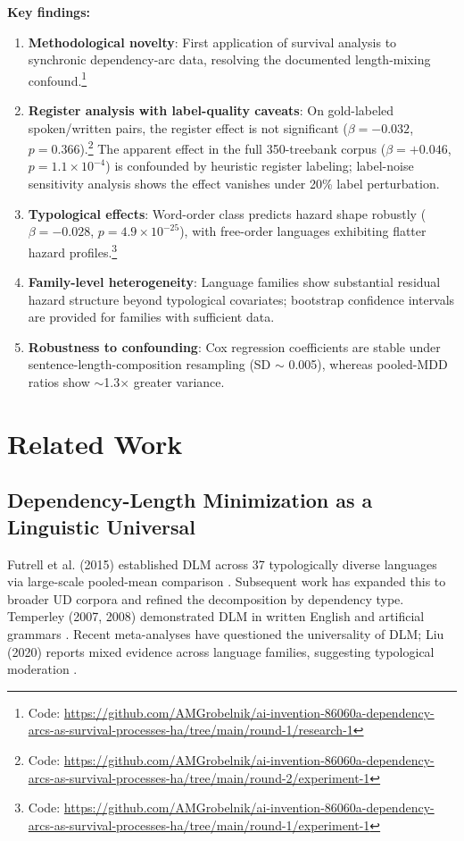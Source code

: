\documentclass[11pt,letterpaper]{article}
\begin{document}
\textbf{Key findings:}
\begin{enumerate}
\item \textbf{Methodological novelty}: First application of survival analysis to synchronic dependency-arc data, resolving the documented length-mixing confound.\footnote{Code: \url{https://github.com/AMGrobelnik/ai-invention-86060a-dependency-arcs-as-survival-processes-ha/tree/main/round-1/research-1}}
\item \textbf{Register analysis with label-quality caveats}: On gold-labeled spoken/written pairs, the register effect is not significant ($\beta=-0.032$, $p=0.366$).\footnote{Code: \url{https://github.com/AMGrobelnik/ai-invention-86060a-dependency-arcs-as-survival-processes-ha/tree/main/round-2/experiment-1}} The apparent effect in the full 350-treebank corpus ($\beta=+0.046$, $p=1.1\times10^{-4}$) is confounded by heuristic register labeling; label-noise sensitivity analysis shows the effect vanishes under 20\% label perturbation.
\item \textbf{Typological effects}: Word-order class predicts hazard shape robustly ($\beta=-0.028$, $p=4.9\times10^{-25}$), with free-order languages exhibiting flatter hazard profiles.\footnote{Code: \url{https://github.com/AMGrobelnik/ai-invention-86060a-dependency-arcs-as-survival-processes-ha/tree/main/round-1/experiment-1}}
\item \textbf{Family-level heterogeneity}: Language families show substantial residual hazard structure beyond typological covariates; bootstrap confidence intervals are provided for families with sufficient data.
\item \textbf{Robustness to confounding}: Cox regression coefficients are stable under sentence-length-composition resampling (SD $\sim$ 0.005), whereas pooled-MDD ratios show $\sim$1.3$\times$ greater variance.
\end{enumerate}

\section{Related Work}

\subsection{Dependency-Length Minimization as a Linguistic Universal}

Futrell et al. (2015) established DLM across 37 typologically diverse languages via large-scale pooled-mean comparison \citep{Futrell2015}. Subsequent work has expanded this to broader UD corpora and refined the decomposition by dependency type. Temperley (2007, 2008) demonstrated DLM in written English and artificial grammars \citep{Temperley2007,Temperley2008}. Recent meta-analyses have questioned the universality of DLM; Liu (2020) reports mixed evidence across language families, suggesting typological moderation \citep{Liu2020}.
\end{document}
